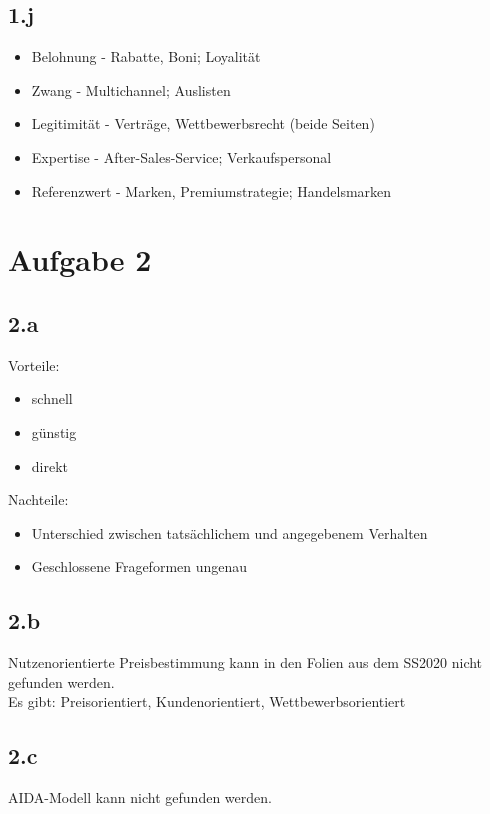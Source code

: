 \subsection{1.j}
    \begin{itemize}
        \item Belohnung - Rabatte, Boni; Loyalität
        \item Zwang - Multichannel; Auslisten
        \item Legitimität - Verträge, Wettbewerbsrecht (beide Seiten)
        \item Expertise - After-Sales-Service; Verkaufspersonal
        \item Referenzwert - Marken, Premiumstrategie; Handelsmarken
    \end{itemize}



\section{Aufgabe 2}
\subsection{2.a}
    Vorteile:
    \begin{itemize}
        \item schnell
        \item günstig
        \item direkt
    \end{itemize}

    Nachteile:
    \begin{itemize}
        \item Unterschied zwischen tatsächlichem und angegebenem Verhalten
        \item Geschlossene Frageformen ungenau
    \end{itemize}

\subsection{2.b}
    Nutzenorientierte Preisbestimmung kann in den Folien aus dem SS2020 nicht gefunden werden. \\
    Es gibt: Preisorientiert, Kundenorientiert, Wettbewerbsorientiert

\subsection{2.c}
    AIDA-Modell kann nicht gefunden werden.

